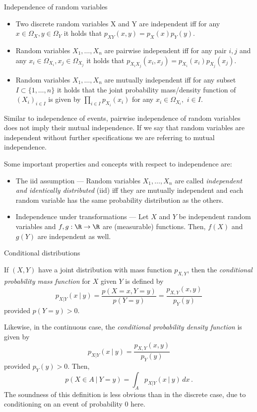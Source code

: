 \documentclass[11pt,compress,t,notes=noshow, xcolor=table]{beamer}
\begin{document}
\begin{vbframe}{Independence of random variables}  
 
\begin{itemize}
	\item 	Two discrete random variables X and Y are independent iff for any $x\in \Omega_X,y\in \Omega_Y$ it holds that $	p_{XY}(x,y) =	p_X(x) p_Y(y).$
	\item Random variables $X_1, \ldots, X_n$ are pairwise independent iff for any pair $i,j$ and any $x_i\in \Omega_{X_i},x_j\in \Omega_{X_j}$ it holds that $	p_{X_iX_j}(x_i,x_j) =	p_{X_i}(x_i) p_{X_j}(x_j).$
	\item Random variables  $X_1, \ldots, X_n$ are mutually independent iff for any subset $I \subset \{1,\ldots,n\}$ it holds that the joint probability mass/density function of $(X_i)_{i\in I}$ is given by
	$  \prod_{i \in I}	p_{X_i}(x_i)$  for any $x_i \in \Omega_{X_i},$ $i\in I.$
\end{itemize}
%
Similar to independence of events, pairwise independence of random variables does not imply their
mutual independence. If we say that random variables are independent without further specifications we
are referring to mutual independence.
%
\framebreak

%
 Some important properties and concepts with respect to independence are:
%	
\begin{itemize}
	\item The iid assumption --- Random variables  $X_1, \ldots, X_n$ are called  \emph{independent and identically distributed} (iid) iff they are mutually independent and each random variable has the same probability distribution as the others.
	\item Independence under transformations --- Let $X$ and $Y$ be independent random variables and $f,g:\R \to \R$ are (measurable) functions. Then, $f(X)$ and $g(Y)$ are independent as well. 
\end{itemize}
%
\end{vbframe}



\begin{frame}[t]{Conditional distributions}
	 
		 If $(X,Y)$ have a joint distribution with mass function $p_{X,Y}$, then the \emph{conditional probability mass function} for $X$ given $Y$ is defined by
		$$
		p_{X|Y}(x ~|~ y) = \frac{p(X=x, Y=y)}{p(Y = y)}  = \frac{p_{X,Y}(x,y)}{p_Y(y)} 
		$$
		provided $p(Y = y) > 0$.
		\lz
		
		Likewise, in the continuous case, the \emph{conditional probability density function} is given by
		$$
		p_{X|Y}(x ~|~ y) = \frac{p_{X,Y}(x,y)}{p_Y(y)} 
		$$
		provided $p_Y(y) > 0$. Then,
		$$
		p(X \in A ~|~ Y= y) = \int_A  p_{X|Y}(x ~|~ y) \, dx \, .
		$$
		The soundness of this definition is less obvious than in the discrete case, due to conditioning on an event of probability 0 here. 
		
\end{frame}
\end{document}
